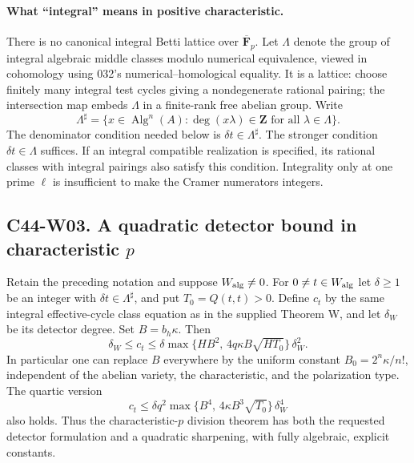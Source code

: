 \paragraph{What ``integral'' means in positive characteristic.}
There is no canonical integral Betti lattice over $\overline{\mathbf F}_p$.
Let $\Lambda$ denote the group of integral algebraic middle classes
modulo numerical equivalence, viewed in cohomology using 032's
numerical--homological equality.  It is a lattice: choose finitely
many integral test cycles giving a nondegenerate rational pairing;
the intersection map embeds $\Lambda$ in a finite-rank free abelian
group.  Write
\[
 \Lambda^\sharp=\{x\in\operatorname{Alg}^n(A):\deg(x\lambda)\in\mathbf Z
                       \text{ for all }\lambda\in\Lambda\}.
\]
The denominator condition needed below is $\delta t\in\Lambda^\sharp$.
The stronger condition $\delta t\in\Lambda$ suffices.  If an integral
compatible realization is specified, its rational classes with integral
pairings also satisfy this condition.  Integrality only at one prime
$\ell$ is insufficient to make the Cramer numerators integers.

\subsection*{C44-W03. A quadratic detector bound in characteristic $p$}

\begin{theorem}
Retain the preceding notation and suppose $W_{\rm alg}\ne0$.
For $0\ne t\in W_{\rm alg}$ let $\delta\geq1$ be an integer with
$\delta t\in\Lambda^\sharp$, and put $T_0=Q(t,t)>0$.
Define $c_t$ by the same integral effective-cycle class equation as
in the supplied Theorem W, and let $\delta_W$ be its detector degree.
Set $B=b_h\kappa$.  Then
\begin{equation}\label{c44:weil-quadratic}
 \delta_W\leq c_t\leq
 \delta\max\{HB^2,\,4q\kappa B\sqrt{HT_0}\}\,\delta_W^2.
\end{equation}
In particular one can replace $B$ everywhere by the uniform constant
$B_0=2^n\kappa/n!$, independent of the abelian variety, the
characteristic, and the polarization type.  The quartic version
\begin{equation}\label{c44:weil-quartic}
 c_t\leq\delta q^2\max\{B^4,\,4\kappa B^3\sqrt{T_0}\}\,\delta_W^4
\end{equation}
also holds.  Thus the characteristic-$p$ division theorem has both
the requested detector formulation and a quadratic sharpening,
with fully algebraic, explicit constants.
\end{theorem}

